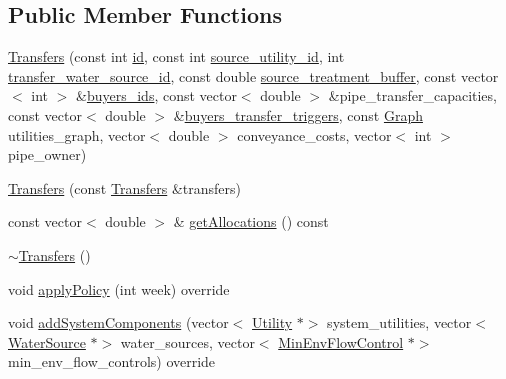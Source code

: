 \subsection*{Public Member Functions}
\begin{DoxyCompactItemize}
\item 
\mbox{\hyperlink{classTransfers_a40555bc28e085d0e119a9f039317c79f_a40555bc28e085d0e119a9f039317c79f}{Transfers}} (const int \mbox{\hyperlink{classDroughtMitigationPolicy_abf3ed19ed98e0d74dc9ae24094be640b_abf3ed19ed98e0d74dc9ae24094be640b}{id}}, const int \mbox{\hyperlink{classTransfers_a4513cfef08bd7e9980d098f8fb7d6a32_a4513cfef08bd7e9980d098f8fb7d6a32}{source\+\_\+utility\+\_\+id}}, int \mbox{\hyperlink{classTransfers_a039a24fe986a718da1ac61bac0e49644_a039a24fe986a718da1ac61bac0e49644}{transfer\+\_\+water\+\_\+source\+\_\+id}}, const double \mbox{\hyperlink{classTransfers_a69a7ec8b065b9c807e2256f205a3d41e_a69a7ec8b065b9c807e2256f205a3d41e}{source\+\_\+treatment\+\_\+buffer}}, const vector$<$ int $>$ \&\mbox{\hyperlink{classTransfers_a55506f9588e0132ffcad1cf0036a83af_a55506f9588e0132ffcad1cf0036a83af}{buyers\+\_\+ids}}, const vector$<$ double $>$ \&pipe\+\_\+transfer\+\_\+capacities, const vector$<$ double $>$ \&\mbox{\hyperlink{classTransfers_a6eab429701a7e1dc857675cc8571589c_a6eab429701a7e1dc857675cc8571589c}{buyers\+\_\+transfer\+\_\+triggers}}, const \mbox{\hyperlink{classGraph}{Graph}} utilities\+\_\+graph, vector$<$ double $>$ conveyance\+\_\+costs, vector$<$ int $>$ pipe\+\_\+owner)
\item 
\mbox{\hyperlink{classTransfers_af88f7908692240eec9f3179128c6f343_af88f7908692240eec9f3179128c6f343}{Transfers}} (const \mbox{\hyperlink{classTransfers}{Transfers}} \&transfers)
\item 
const vector$<$ double $>$ \& \mbox{\hyperlink{classTransfers_a6c687c9f767ea915eead1f5db18711a2_a6c687c9f767ea915eead1f5db18711a2}{get\+Allocations}} () const
\item 
\mbox{\hyperlink{classTransfers_a5dfeafe7a9b9a446b1ab746b65ef3b4b_a5dfeafe7a9b9a446b1ab746b65ef3b4b}{$\sim$\+Transfers}} ()
\item 
void \mbox{\hyperlink{classTransfers_ad9e4e83ff763ac1ba518a19051cd2e69_ad9e4e83ff763ac1ba518a19051cd2e69}{apply\+Policy}} (int week) override
\item 
void \mbox{\hyperlink{classTransfers_a3c1930dbeb1273c1c0be93ad5ca57357_a3c1930dbeb1273c1c0be93ad5ca57357}{add\+System\+Components}} (vector$<$ \mbox{\hyperlink{classUtility}{Utility}} $\ast$$>$ system\+\_\+utilities, vector$<$ \mbox{\hyperlink{classWaterSource}{Water\+Source}} $\ast$$>$ water\+\_\+sources, vector$<$ \mbox{\hyperlink{classMinEnvFlowControl}{Min\+Env\+Flow\+Control}} $\ast$$>$ min\+\_\+env\+\_\+flow\+\_\+controls) override
$$
\end{DoxyCompactItemize}
